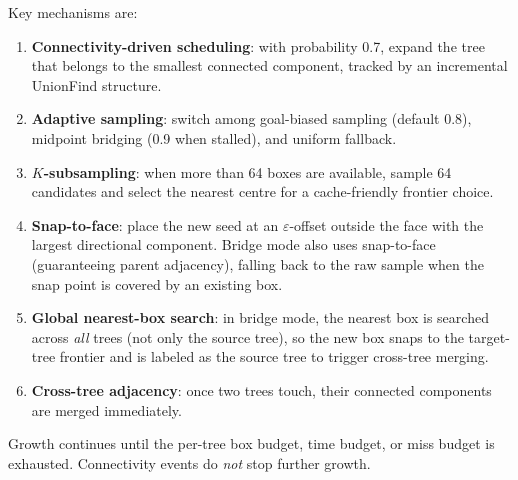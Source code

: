 \documentclass[journal]{IEEEtran}
\begin{document}
Key mechanisms are:
\begin{enumerate}[nosep]
  \item \textbf{Connectivity-driven scheduling}: with probability 0.7,
    expand the tree that belongs to the smallest connected component,
    tracked by an incremental UnionFind structure.
  \item \textbf{Adaptive sampling}: switch among goal-biased sampling
    (default 0.8), midpoint bridging (0.9 when stalled), and uniform
    fallback.
  \item \textbf{$K$-subsampling}: when more than 64 boxes are available,
    sample 64 candidates and select the nearest centre for a
    cache-friendly frontier choice.
  \item \textbf{Snap-to-face}: place the new seed at an
    $\varepsilon$-offset outside the face with the largest directional
    component.  Bridge mode also uses snap-to-face (guaranteeing
    parent adjacency), falling back to the raw sample when the snap
    point is covered by an existing box.
  \item \textbf{Global nearest-box search}: in bridge mode, the nearest
    box is searched across \emph{all} trees (not only the source
    tree), so the new box snaps to the target-tree frontier and is
    labeled as the source tree to trigger cross-tree merging.
  \item \textbf{Cross-tree adjacency}: once two trees touch, their
    connected components are merged immediately.
\end{enumerate}

Growth continues until the per-tree box budget, time budget, or miss
budget is exhausted. Connectivity events do \emph{not} stop further
growth.
\end{document}
